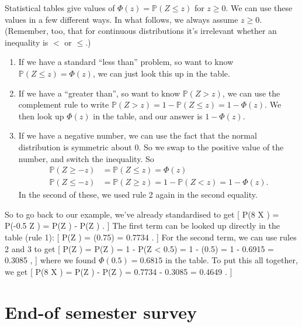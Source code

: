 \documentclass[
  letterpaper,
  DIV=11,
  numbers=noendperiod]{scrreprt}
\providecommand{\tightlist}{%
  \setlength{\itemsep}{0pt}\setlength{\parskip}{0pt}}\usepackage{longtable,booktabs,array}
\theoremstyle{remark}
\begin{document}
Statistical tables give values of \(\Phi(z) = \mathbb P(Z \leq z)\) for
\(z \geq 0\). We can use these values in a few different ways. In what
follows, we always assume \(z \geq 0\). (Remember, too, that for
continuous distributions it's irrelevant whether an inequality is \(<\)
or \(\leq\).)

\begin{enumerate}
\def\labelenumi{\arabic{enumi}.}
\tightlist
\item
  If we have a standard ``less than'' problem, so want to know
  \(\mathbb P(Z \leq z) = \Phi(z)\), we can just look this up in the
  table.
\item
  If we have a ``greater than'', so want to know \(\mathbb P(Z > z)\),
  we can use the complement rule to write
  \(\mathbb P(Z > z) = 1 - \mathbb P(Z \leq z) = 1 - \Phi(z)\). We then
  look up \(\Phi(z)\) in the table, and our answer is \(1 - \Phi(z)\).
\item
  If we have a negative number, we can use the fact that the normal
  distribution is symmetric about 0. So we swap to the positive value of
  the number, and switch the inequality. So \begin{align*}
  \mathbb P(Z \geq -z) &= \mathbb P(Z \leq z) = \Phi(z) \\
  \mathbb P(Z \leq -z) &= \mathbb P(Z \geq z) = 1 - \mathbb P(Z < z) = 1 - \Phi(z) .
  \end{align*} In the second of these, we used rule 2 again in the
  second equality.
\end{enumerate}

So to go back to our example, we've already standardised to get {[}
\mathbb P(8 \leq X ) = \mathbb P(-0.5 \leq Z ) =
\mathbb P(Z ) - \mathbb P(Z ) . {]} The first term can
be looked up directly in the table (rule 1): {[} \mathbb P(Z )
= \Phi(0.75) = 0.7734 . {]} For the second term, we can use rules 2 and
3 to get {[} \mathbb P(Z ) = \mathbb P(Z ) = 1 -
\mathbb P(Z \textless{} 0.5) = 1 - \Phi(0.5) = 1 - 0.6915 = 0.3085 , {]}
where we found \(\Phi(0.5) = 0.6815\) in the table. To put this all
together, we get {[} \mathbb P(8 \leq X ) = \mathbb P(Z
) - \mathbb P(Z ) = 0.7734 - 0.3085 = 0.4649 . {]}

\hypertarget{end-of-semester-survey}{%
\section{End-of semester survey}\label{end-of-semester-survey}}
\end{document}
